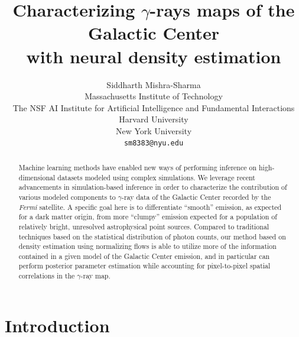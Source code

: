\documentclass[]{article}
\title{Characterizing $\gamma$-rays maps of the Galactic Center \\ with neural density estimation}
\author{
Siddharth Mishra-Sharma \\
Massachusetts Institute of Technology \\
The NSF AI Institute for Artificial Intelligence and Fundamental Interactions \\
Harvard University \\ 
New York University \\
\texttt{sm8383@nyu.edu} \\
}
\newcommand{\Fermi}{\emph{Fermi}\xspace}
\begin{document}
\maketitle

\begin{abstract}
Machine learning methods have enabled new ways of performing inference on high-dimensional datasets modeled using complex simulations. We leverage recent advancements in simulation-based inference in order to characterize the contribution of various modeled components to $\gamma$-ray data of the Galactic Center recorded by the \Fermi satellite. A specific goal here is to differentiate ``smooth'' emission, as expected for a dark matter origin, from more ``clumpy'' emission expected for a population of relatively bright, unresolved astrophysical point sources. Compared to traditional techniques based on the statistical distribution of photon counts, our method based on density estimation using normalizing flows is able to utilize more of the information contained in a given model of the Galactic Center emission, and in particular can perform posterior parameter estimation while accounting for pixel-to-pixel spatial correlations in the $\gamma$-ray map. 

\end{abstract}

\section{Introduction}
\label{sec:intro}
\end{document}
